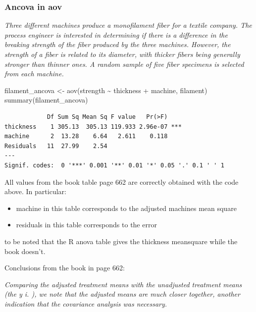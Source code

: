 \documentclass[
]{book}
\newenvironment{Shaded}{\begin{snugshade}}{\end{snugshade}}
\newcommand{\FunctionTok}[1]{\textcolor[rgb]{0.00,0.00,0.00}{#1}}
\newcommand{\NormalTok}[1]{#1}
\newcommand{\OtherTok}[1]{\textcolor[rgb]{0.56,0.35,0.01}{#1}}
\newcommand{\SpecialCharTok}[1]{\textcolor[rgb]{0.00,0.00,0.00}{#1}}
\providecommand{\tightlist}{%
  \setlength{\itemsep}{0pt}\setlength{\parskip}{0pt}}
\begin{document}
\hypertarget{ancova-in-aov}{%
\subsubsection{Ancova in aov}\label{ancova-in-aov}}

\emph{Three different machines produce a monofilament fiber for a textile company. The process engineer is interested in determining if there is a difference in the breaking strength of the fiber produced by the three machines. However, the strength of a fiber is related to its diameter, with thicker fibers being generally stronger than thinner ones. A random sample of five fiber specimens is selected from each machine.}

\begin{Shaded}
\begin{Highlighting}[]
\NormalTok{filament\_ancova }\OtherTok{\textless{}{-}} \FunctionTok{aov}\NormalTok{(strength }\SpecialCharTok{\textasciitilde{}}\NormalTok{ thickness  }\SpecialCharTok{+}\NormalTok{ machine, filament)}
\FunctionTok{summary}\NormalTok{(filament\_ancova)}
\end{Highlighting}
\end{Shaded}

\begin{verbatim}
            Df Sum Sq Mean Sq F value   Pr(>F)    
thickness    1 305.13  305.13 119.933 2.96e-07 ***
machine      2  13.28    6.64   2.611    0.118    
Residuals   11  27.99    2.54                     
---
Signif. codes:  0 '***' 0.001 '**' 0.01 '*' 0.05 '.' 0.1 ' ' 1
\end{verbatim}

All values from the book table page 662 are correctly obtained with the code above. In particular:

\begin{itemize}
\tightlist
\item
  machine in this table corresponds to the adjusted machines mean square
\item
  residuals in this table corresponds to the error
\end{itemize}

to be noted that the R anova table gives the thickness meansquare while the book doesn't.

Conclusions from the book in page 662:

\emph{Comparing the adjusted treatment means with the unadjusted treatment means (the y i. ), we note that the adjusted means are much closer together, another indication that the covariance analysis was necessary.}
\end{document}
